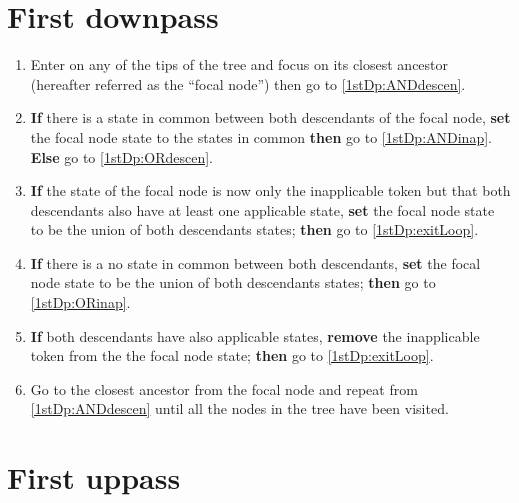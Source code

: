 \documentclass[a4paper,12pt]{article}
\begin{document}


\section{First downpass} \label{1stDp}

\begin{enumerate}
    \item Enter on any of the tips of the tree and focus on its closest ancestor (hereafter referred as the ``focal node'') then go to \ref{1stDp:ANDdescen}.
    \item \label{1stDp:ANDdescen} \textbf{If} there is a state in common between both descendants of the focal node, \textbf{set} the focal node state to the states in common \textbf{then} go to \ref{1stDp:ANDinap}. \textbf{Else} go to \ref{1stDp:ORdescen}.
    \item \label{1stDp:ANDinap} \textbf{If} the state of the focal node is now only the inapplicable token but that both descendants also have at least one applicable state, \textbf{set} the focal node state to be the union of both descendants states; \textbf{then} go to \ref{1stDp:exitLoop}.
    \item \label{1stDp:ORdescen} \textbf{If} there is a no state in common between both descendants, \textbf{set} the focal node state to be the union of both descendants states; \textbf{then} go to \ref{1stDp:ORinap}.
    \item \label{1stDp:ORinap} \textbf{If} both descendants have also applicable states, \textbf{remove} the inapplicable token from the the focal node state; \textbf{then} go to \ref{1stDp:exitLoop}.
    \item \label{1stDp:exitLoop} Go to the closest ancestor from the focal node and repeat from \ref{1stDp:ANDdescen} until all the nodes in the tree have been visited.
\end{enumerate}

\section{First uppass} \label{1stUp}
\end{document}
